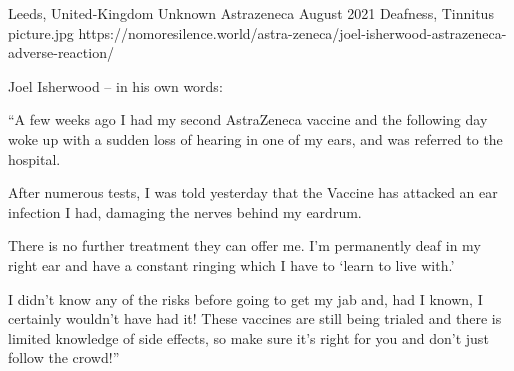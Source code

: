 {Leeds, United-Kingdom}
{Unknown}
{Astrazeneca}
{August 2021}
{Deafness, Tinnitus}
{picture.jpg}
{https://nomoresilence.world/astra-zeneca/joel-isherwood-astrazeneca-adverse-reaction/}
{

Joel Isherwood – in his own words:

“A few weeks ago I had my second AstraZeneca vaccine and the following day woke
up with a sudden loss of hearing in one of my ears, and was referred to the
hospital.

After numerous tests, I was told yesterday that the Vaccine has attacked an ear
infection I had, damaging the nerves behind my eardrum.

There is no further treatment they can offer me. I’m permanently deaf in my
right ear and have a constant ringing which I have to ‘learn to live with.’

I didn’t know any of the risks before going to get my jab and, had I known, I
certainly wouldn’t have had it! These vaccines are still being trialed and there
is limited knowledge of side effects, so make sure it’s right for you and don’t
just follow the crowd!”

}
